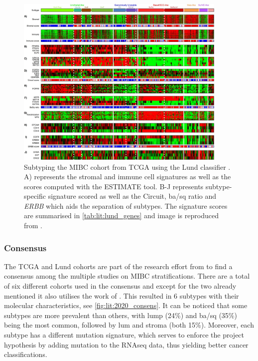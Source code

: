 \begin{figure}[!t]   
\centering
\includegraphics[width=0.9\textwidth,height=0.9\textheight,keepaspectratio]{Sections/Lit_review/Resources/Lung_subtypes.jpg}
  \caption[Summary of MIBC subtypes using Lund classifier]{Subtyping the MIBC cohort from TCGA using the Lund classifier \citep{Marzouka2018-ge}. A) represents the stromal and immune cell signatures as well as the scores computed with the ESTIMATE tool\citep{Yoshihara2013-wq}. B-J represents subtype-specific signature scored as well as the Circuit, \acrshort{ba/sq} ratio and \textit{ERBB} which aids the separation of subtypes. The signature scores are summarised in \cref{tab:lit:lund_genes} and image is reproduced from \citep{Marzouka2018-ge}.
}
\label{fig:lit:lund_fig}
\end{figure}
\FloatBarrier


\subsubsection*{Consensus} \label{s:lit:consensus_mibc}

The TCGA and Lund cohorts are part of the research effort from \citet{Kamoun2020-tj} to find a consensus among the multiple studies on MIBC stratifications. There are a total of six different cohorts used in the consensus and except for the two already mentioned \citep{Kamoun2020-tj} it also utilises the work of \citep{Mo2018-rl, Damrauer2014-tc, Choi2014-ed, Rebouissou2014-ep}. This resulted in 6 subtypes with their molecular characteristics, see \cref{fig:lit:2020_consens}. It can be noticed that some subtypes are more prevalent than others, with \acrfull{lump} (24\%) and \acrlong{ba/sq} (35\%) being the most common, followed by \acrlong{lum} and \acrlong{stroma} (both 15\%). Moreover, each subtype has a different mutation signature, which serves to enforce the project hypothesis by adding mutation to the RNAseq data, thus yielding better cancer classifications.

